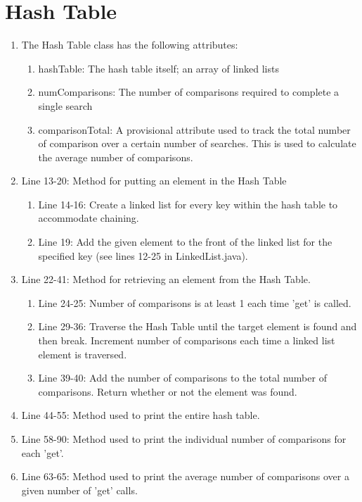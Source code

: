 \documentclass[letterpaper, 10pt,DIV=13]{scrartcl}
\numberwithin{equation}{section} %
\numberwithin{figure}{section} %
\numberwithin{table}{section} %
\begin{document}
\section{Hash Table}
\begin{enumerate}
    \item The Hash Table class has the following attributes:
        \begin{enumerate}
            \item hashTable: The hash table itself; an array of linked lists
            \item numComparisons: The number of comparisons required to complete a single search
            \item comparisonTotal: A provisional attribute used to track the total number of comparison over a certain number of searches. This is used to calculate the average number of comparisons. 
        \end{enumerate}
    \item Line 13-20: Method for putting an element in the Hash Table
    \begin{enumerate}
        \item Line 14-16: Create a linked list for every key within the hash table to accommodate chaining.
        \item Line 19: Add the given element to the front of the linked list for the specified key (see lines 12-25 in LinkedList.java).
    \end{enumerate}
    \item Line 22-41: Method for retrieving an element from the Hash Table.
    \begin{enumerate}
        \item Line 24-25: Number of comparisons is at least 1 each time 'get' is called.
        \item Line 29-36: Traverse the Hash Table until the target element is found and then break. Increment number of comparisons each time a linked list element is traversed.
        \item Line 39-40: Add the number of comparisons to the total number of comparisons. Return whether or not the element was found.
    \end{enumerate}
    \item Line 44-55: Method used to print the entire hash table.
    \item Line 58-90: Method used to print the individual number of comparisons for each 'get'.
    \item Line 63-65: Method used to print the average number of comparisons over a given number of 'get' calls.

\end{enumerate}
\end{document}
